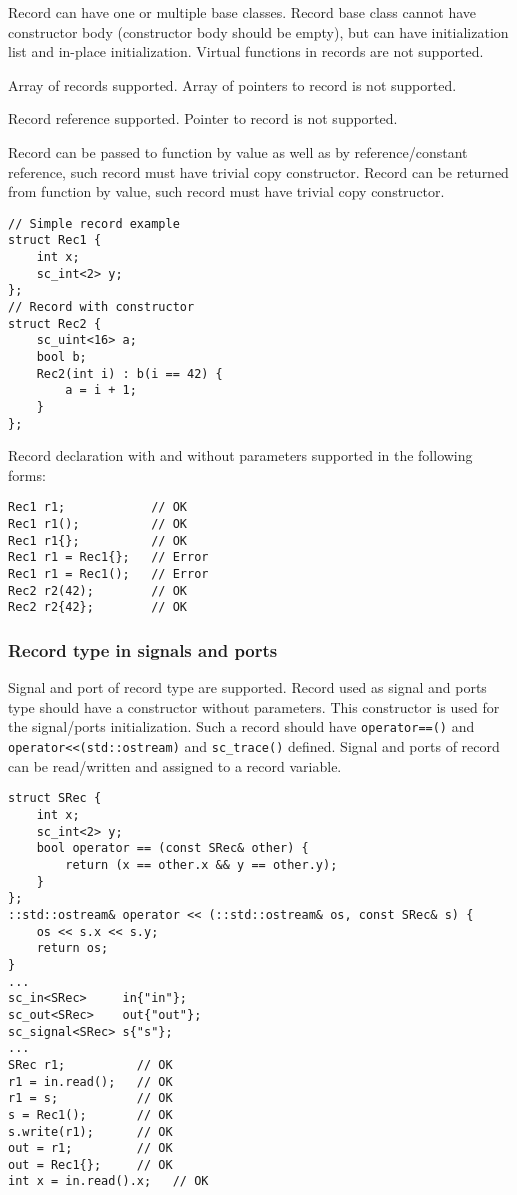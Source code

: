 Record can have one or multiple base classes. Record base class cannot have constructor body (constructor body should be empty), but can have initialization list and in-place initialization. Virtual functions in records are not supported.

Array of records supported. Array of pointers to record is not supported. 

Record reference supported. Pointer to record is not supported.

Record can be passed to function by value as well as by reference/constant reference, such record must have trivial copy constructor. Record can be returned from function by value, such record must have trivial copy constructor.
%
\begin{lstlisting}[style=mycpp]
// Simple record example
struct Rec1 {
    int x;
    sc_int<2> y;
};
// Record with constructor
struct Rec2 {
    sc_uint<16> a;       
    bool b;
    Rec2(int i) : b(i == 42) {
        a = i + 1;
    }
};
\end{lstlisting}

Record declaration with and without parameters supported in the following forms:
%
\begin{lstlisting}[style=mycpp]
Rec1 r1;        	// OK
Rec1 r1();        	// OK
Rec1 r1{};        	// OK
Rec1 r1 = Rec1{}; 	// Error
Rec1 r1 = Rec1();  	// Error
Rec2 r2(42);    	// OK
Rec2 r2{42};    	// OK
\end{lstlisting}

\subsubsection{Record type in signals and ports}

Signal and port of record type are supported. Record used as signal and ports type should have a constructor without parameters. This constructor is used for the signal/ports initialization. Such a record should have {\tt operator==()} and {\tt operator<<(std::ostream)} and {\tt sc\_trace()} defined.
Signal and ports of record can be read/written and assigned to a record variable.
%
\begin{lstlisting}[style=mycpp]
struct SRec {
    int x;
    sc_int<2> y;
    bool operator == (const SRec& other) {
        return (x == other.x && y == other.y);
    } 
};
::std::ostream& operator << (::std::ostream& os, const SRec& s) {
    os << s.x << s.y;
    return os;
}
...
sc_in<SRec>     in{"in"};
sc_out<SRec>    out{"out"};
sc_signal<SRec> s{"s"};
...
SRec r1;          // OK
r1 = in.read();   // OK
r1 = s;           // OK
s = Rec1();       // OK
s.write(r1);      // OK
out = r1;         // OK
out = Rec1{};     // OK
int x = in.read().x;   // OK
\end{lstlisting}
 
